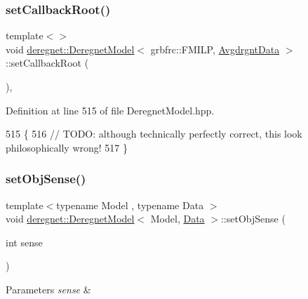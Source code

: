 \subsubsection{\texorpdfstring{set\+Callback\+Root()}{setCallbackRoot()}\hspace{0.1cm}{\footnotesize\ttfamily [3/3]}}
{\footnotesize\ttfamily template$<$$>$ \\
void \hyperlink{classderegnet_1_1DeregnetModel}{deregnet\+::\+Deregnet\+Model}$<$ grbfrc\+::\+F\+M\+I\+LP, \hyperlink{classderegnet_1_1AvgdrgntData}{Avgdrgnt\+Data} $>$\+::set\+Callback\+Root (\begin{DoxyParamCaption}{ }\end{DoxyParamCaption})\hspace{0.3cm}{\ttfamily [inline]}, {\ttfamily [private]}}



Definition at line 515 of file Deregnet\+Model.\+hpp.


\begin{DoxyCode}
515                                                                \{
516     \textcolor{comment}{// TODO: although technically perfectly correct, this look philosophically wrong!}
517 \}
\end{DoxyCode}
\mbox{\label{classderegnet_1_1DeregnetModel_adf44f15b2e57acc52c0ba9cca134b33e}} 
\subsubsection{\texorpdfstring{set\+Obj\+Sense()}{setObjSense()}\hspace{0.1cm}{\footnotesize\ttfamily [1/2]}}
{\footnotesize\ttfamily template$<$typename Model , typename Data $>$ \\
void \hyperlink{classderegnet_1_1DeregnetModel}{deregnet\+::\+Deregnet\+Model}$<$ Model, \hyperlink{avgdrgnt_8cpp_a1d1235306db276e9b36acba1db1509e8}{Data} $>$\+::set\+Obj\+Sense (\begin{DoxyParamCaption}\item[{int}]{sense }\end{DoxyParamCaption})}


\begin{DoxyParams}{Parameters}
{\em sense} & \\
\hline
\end{DoxyParams}


